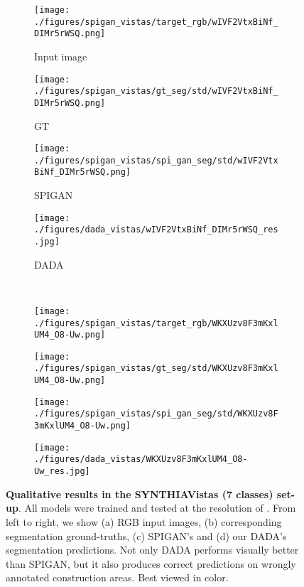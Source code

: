 \documentclass[10pt,twocolumn,letterpaper]{article}
\begin{document}
\begin{figure*}[t!]
	\begin{center}
		\begin{subfigure}[t]{0.24\textwidth}\centering
			\caption{Input image}\vspace{-0.2cm}
			\texttt{[image: ./figures/spigan\_vistas/target\_rgb/wIVF2VtxBiNf\_DIMr5rWSQ.png]}
		\end{subfigure}
		\begin{subfigure}[t]{0.24\textwidth}\centering
			\caption{GT}\vspace{-0.2cm}
			\texttt{[image: ./figures/spigan\_vistas/gt\_seg/std/wIVF2VtxBiNf\_DIMr5rWSQ.png]}
		\end{subfigure}
		\begin{subfigure}[t]{0.24\textwidth}\centering
			\caption{SPIGAN}\vspace{-0.2cm}
			\texttt{[image: ./figures/spigan\_vistas/spi\_gan\_seg/std/wIVF2VtxBiNf\_DIMr5rWSQ.png]}
		\end{subfigure}
		\begin{subfigure}[t]{0.24\textwidth}\centering
			\caption{DADA}\vspace{-0.2cm}
			\texttt{[image: ./figures/dada\_vistas/wIVF2VtxBiNf\_DIMr5rWSQ\_res.jpg]}
		\end{subfigure}\\
		\vspace{0.02cm}
		\hdashrule[1ex][x]{17cm}{1.5pt}{1.5mm}\vspace{-0.13cm}
		\begin{subfigure}[t]{0.24\textwidth}\centering
			\texttt{[image: ./figures/spigan\_vistas/target\_rgb/WKXUzv8F3mKxlUM4\_O8-Uw.png]}
		\end{subfigure}
		\begin{subfigure}[t]{0.24\textwidth}\centering
			\texttt{[image: ./figures/spigan\_vistas/gt\_seg/std/WKXUzv8F3mKxlUM4\_O8-Uw.png]}
		\end{subfigure}
		\begin{subfigure}[t]{0.24\textwidth}\centering
			\texttt{[image: ./figures/spigan\_vistas/spi\_gan\_seg/std/WKXUzv8F3mKxlUM4\_O8-Uw.png]}
		\end{subfigure}
		\begin{subfigure}[t]{0.24\textwidth}\centering
			\texttt{[image: ./figures/dada\_vistas/WKXUzv8F3mKxlUM4\_O8-Uw\_res.jpg]}
		\end{subfigure}
	\end{center}
	\vspace{-0.3cm}
	\caption{\small \textbf{Qualitative results in the SYNTHIAVistas (7 classes) set-up}. All models were trained and tested at the resolution of . From left to right, we show (a) RGB input images, (b) corresponding segmentation ground-truths, (c) SPIGAN's and (d) our DADA's segmentation predictions. Not only DADA performs visually better than SPIGAN, but it also produces correct predictions on wrongly annotated construction areas. Best viewed in color.}
	\label{fig:sup_qual_seg}
\end{figure*}
\end{document}
